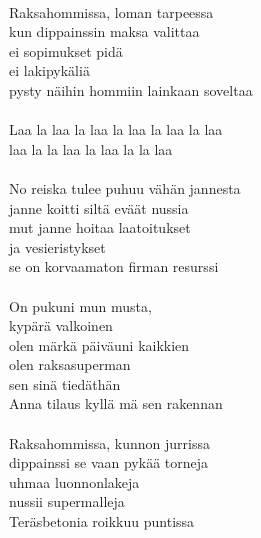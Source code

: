 \hspace{10mm} \\ Raksahommissa, loman tarpeessa \\ kun dippainssin maksa valittaa \\ ei sopimukset pidä \\ ei lakipykäliä \\ pysty näihin hommiin lainkaan soveltaa \\ \hspace{10mm} \\ Laa la laa la laa la laa la laa la laa \\ laa la la laa la laa la la laa \\ \hspace{10mm} \\ No reiska tulee puhuu vähän jannesta \\ janne koitti siltä eväät nussia \\ mut janne hoitaa laatoitukset \\ ja vesieristykset \\ se on korvaamaton firman resurssi \\ \hspace{10mm} \\ On pukuni mun musta, \\ kypärä valkoinen \\ olen märkä päiväuni kaikkien \\ olen raksasuperman \\ sen sinä tiedäthän \\ Anna tilaus kyllä mä sen rakennan \\ \hspace{10mm} \\ Raksahommissa, kunnon jurrissa \\ dippainssi se vaan pykää torneja \\ uhmaa luonnonlakeja \\ nussii supermalleja \\ Teräsbetonia roikkuu puntissa